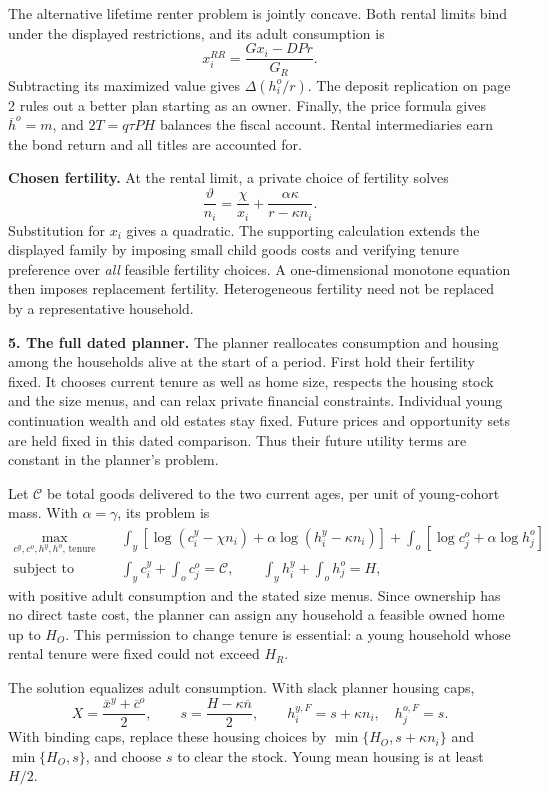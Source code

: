 \documentclass[11pt]{article}
\newcommand{\avg}[1]{\overline{#1}}
\begin{document}
The alternative lifetime renter problem is jointly concave. Both rental
limits bind under the displayed restrictions, and its adult consumption is
\[
x_i^{RR}=\frac{Gx_i-DPr}{G_R}.
\]
Subtracting its maximized value gives $\Delta(h_i^o/r)$. The deposit
replication on page 2 rules out a better plan starting as an owner. Finally,
the price formula gives $\avg h^o=m$, and $2T=q\tau PH$ balances the fiscal
account. Rental intermediaries earn the bond return and all titles are
accounted for.

\textbf{Chosen fertility.}
At the rental limit, a private choice of fertility solves
\[
\frac{\vartheta}{n_i}
=\frac{\chi}{x_i}+\frac{\alpha\kappa}{r-\kappa n_i}.
\]
Substitution for $x_i$ gives a quadratic. The supporting calculation extends
the displayed family by imposing small child goods costs and verifying
tenure preference over \emph{all} feasible fertility choices. A one-dimensional
monotone equation then imposes replacement fertility. Heterogeneous fertility
need not be replaced by a representative household.

\newpage
\textbf{5. The full dated planner.}
The planner reallocates consumption and housing among the households alive
at the start of a period. First hold their fertility fixed. It chooses
current tenure as well as home size, respects the housing stock and the
size menus, and can relax private financial constraints.
Individual young continuation wealth and old estates stay fixed. Future prices and
opportunity sets are held fixed in this dated comparison. Thus their future utility
terms are constant in the planner's problem.

Let $\mathcal C$ be total goods delivered to the two current ages, per unit
of young-cohort mass. With $\alpha=\gamma$, its problem is
\[
\begin{aligned}
\max_{c^y,c^o,h^y,h^o,\,\text{tenure}}\quad
 &\int_y\!\left[\log(c_i^y-\chi n_i)
                  +\alpha\log(h_i^y-\kappa n_i)\right]
 +\int_o\!\left[\log c_j^o+\alpha\log h_j^o\right]\\
\text{subject to}\quad
 &\int_y c_i^y+\int_o c_j^o=\mathcal C,\qquad
 \int_y h_i^y+\int_o h_j^o=H,
\end{aligned}
\]
with positive adult consumption and the stated size menus. Since ownership
has no direct taste cost, the planner can assign any household a feasible
owned home up to $H_O$. This permission to change tenure is essential: a
young household whose rental tenure were fixed could not exceed $H_R$.

The solution equalizes adult consumption. With slack planner housing caps,
\[
X=\frac{\avg x^y+\avg c^o}{2},\qquad
s=\frac{H-\kappa\avg n}{2},\qquad
h_i^{y,F}=s+\kappa n_i,\quad h_j^{o,F}=s.
\]
With binding caps, replace these housing choices by
$\min\{H_O,s+\kappa n_i\}$ and $\min\{H_O,s\}$, and choose $s$ to clear
the stock. Young mean housing is at least $H/2$.
\end{document}
